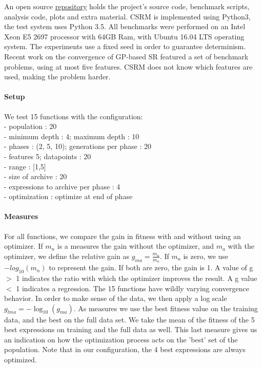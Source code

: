An open source \href{https://bitbucket.org/bcardoen/csrm}{repository} holds the project's source code, benchmark scripts, analysis code, plots and extra material. CSRM is implemented using Python3, the test system uses Python 3.5. 
All benchmarks were performed on an Intel Xeon E5 2697 processor with 64GB Ram, with Ubuntu 16.04 LTS operating system. The experiments use a fixed seed in order to guarantee determinism. 
Recent work on the convergence of GP-based SR \cite{SRAccur, SRBaseline} featured a set of benchmark problems, using at most five features. CSRM does not know which features are used, making the problem harder. 
\paragraph{Setup}
We test 15 functions with the configuration: \\
- population : 20\\
- minimum depth : 4; maximum depth : 10\\
- phases : (2, 5, 10); generations per phase : 20\\
- features 5; datapoints : 20\\
- range : [1,5]\\
- size of archive : 20\\
- expressions to archive per phase : 4\\
- optimization : optimize at end of phase
\paragraph{Measures}
For all functions, we compare the gain in fitness with and without using an optimizer. 
If $m_n$ is a measures the gain without the optimizer, and $m_a$ with the optimizer, we define the relative gain as $ g_{ma} = \frac{m_n}{m_a}$. If $m_a$ is zero, we use $-log_{10}(m_n)$ to represent the gain. If both are zero, the gain is 1. A value of g $>$ 1 indicates the ratio with which the optimizer improves the result. A g value $<$ 1 indicates a regression. The 15 functions have wildly varying convergence behavior. In order to make sense of the data, we then apply a log scale $ g_{lma} = - \log_{10}(g_{ma}) $.
As measures we use the best fitness value on the training data, and the best on the full data set. We take the mean of the fitness of the 5 best expressions on training and the full data as well. This last measure gives us an indication on how the optimization process acts on the 'best' set of the population. Note that in our configuration, the 4 best expressions are always optimized.
